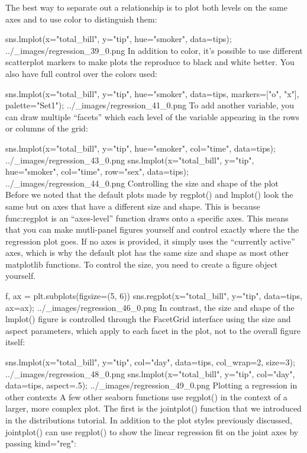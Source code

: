The best way to separate out a relationship is to plot both levels on the same axes and to use color to distinguish them:

sns.lmplot(x="total_bill", y="tip", hue="smoker", data=tips);
../_images/regression_39_0.png
In addition to color, it’s possible to use different scatterplot markers to make plots the reproduce to black and white better. You also have full control over the colors used:

sns.lmplot(x="total_bill", y="tip", hue="smoker", data=tips,
           markers=["o", "x"], palette="Set1");
../_images/regression_41_0.png
To add another variable, you can draw multiple “facets” which each level of the variable appearing in the rows or columns of the grid:

sns.lmplot(x="total_bill", y="tip", hue="smoker", col="time", data=tips);
../_images/regression_43_0.png
sns.lmplot(x="total_bill", y="tip", hue="smoker",
           col="time", row="sex", data=tips);
../_images/regression_44_0.png
Controlling the size and shape of the plot
Before we noted that the default plots made by regplot() and lmplot() look the same but on axes that have a different size and shape. This is because func:regplot is an “axes-level” function draws onto a specific axes. This means that you can make mutli-panel figures yourself and control exactly where the the regression plot goes. If no axes is provided, it simply uses the “currently active” axes, which is why the default plot has the same size and shape as most other matplotlib functions. To control the size, you need to create a figure object yourself.

f, ax = plt.subplots(figsize=(5, 6))
sns.regplot(x="total_bill", y="tip", data=tips, ax=ax);
../_images/regression_46_0.png
In contrast, the size and shape of the lmplot() figure is controlled through the FacetGrid interface using the size and aspect parameters, which apply to each facet in the plot, not to the overall figure itself:

sns.lmplot(x="total_bill", y="tip", col="day", data=tips,
           col_wrap=2, size=3);
../_images/regression_48_0.png
sns.lmplot(x="total_bill", y="tip", col="day", data=tips,
           aspect=.5);
../_images/regression_49_0.png
Plotting a regression in other contexts
A few other seaborn functions use regplot() in the context of a larger, more complex plot. The first is the jointplot() function that we introduced in the distributions tutorial. In addition to the plot styles previously discussed, jointplot() can use regplot() to show the linear regression fit on the joint axes by passing kind="reg":

